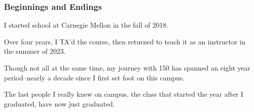 \documentclass[aspectratio=169, handout]{beamer}
\begin{document}
\begin{frame}[fragile]
  \frametitle{Beginnings and Endings}

  I started school at Carnegie Mellon in the fall of 2018.

  \pause
  \vspace{\fill}

  Over four years, I TA'd the course, then returned to teach it as
  an instructor in the summer of 2023.

  \pause
  \vspace{\fill}

  Though not all at the same time, my journey with 150 has spanned an
  eight year period--nearly a decade since I first set foot on this campus.

  \pause
  \vspace{\fill}

  The last people I really knew on campus, the class that started the year
  after I graduated, have now just graduated.

\end{frame}
\end{document}
